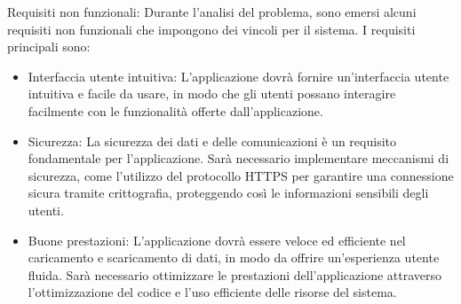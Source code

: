 Requisiti non funzionali:\newline 
Durante l'analisi del problema, sono emersi alcuni requisiti non funzionali che impongono dei vincoli per il sistema. I requisiti principali sono:\newline

\begin{itemize}
	\item Interfaccia utente intuitiva: L'applicazione dovrà fornire un'interfaccia utente intuitiva e facile da usare, in modo che gli utenti possano interagire facilmente con le funzionalità offerte dall'applicazione.
	\item Sicurezza: La sicurezza dei dati e delle comunicazioni è un requisito fondamentale per l'applicazione. Sarà necessario implementare meccanismi di sicurezza, come l'utilizzo del protocollo HTTPS per garantire una connessione sicura tramite crittografia, proteggendo così le informazioni sensibili degli utenti.
	\item
    Buone prestazioni: L'applicazione dovrà essere veloce ed efficiente nel caricamento e scaricamento di dati, in modo da offrire un'esperienza utente fluida. Sarà necessario ottimizzare le prestazioni dell'applicazione attraverso l'ottimizzazione del codice e l'uso efficiente delle risorse del sistema.
\end{itemize}
